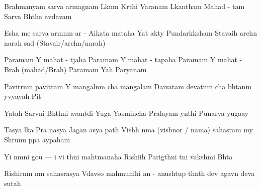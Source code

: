 \documentclass[20pt]{article}
\begin{document}
\SlokaHuge
{Brahmanyam sarva {\Dh}armagnam} {L{\oh}k{\A}n{\A}m K{\ee}rthi Var{\dhh}anam}
{L{\oh}kan{\A}tham Mahad - {\bh} {\oo}tam} {Sarva Bh{\oo}tha {\bh}av{\oh}d{\bh}avam}

\SlokaHuge
{Esha me sarva {\Dh}arm{\A}n{\A}m} {{\Dh}ar{\mo} - A{\dhh}ikata{\mo} mataha}
{Yat \dsh {\bh}akty{\A} Pundar{\ee}k{\A}ksham} {Stavaih arch{\e}n narah sad{\A} (Stavair/arch{\e}n/narah)}

\novspace
\SlokaHuge
{Paramam Y{\oh} mahat - t{\e}jaha} {Paramam Y{\oh} mahat - tapaha}
{Paramam Y{\oh} mahat - Brah{\ma} (mahad/Brah{\ma})} {Paramam Yah Par{\A}yanam}

\SlokaHuge
{Pavitr{\A}n{\A}m pavitram Y{\oh}} {mangal{\A}n{\A}m cha mangalam}
{Daivatam devat{\A}n{\A}m cha} {bh{\oo}tan{\A}m y{\oh}vyayah Pit{\A}}

\SlokaHuge
{Yatah Sarv{\A}ni Bh{\oo}th{\A}ni} {{\Bh}avant{\ya}di Yu{\ga}ga{\me}}
{Yasmin{\sh}cha Pralayam y{\A}nthi} {Punar{\e}va yuga{\ksh}ay{\e}}

\SlokaHuge
{Tasya l{\oh}ka Pra{\dhh} {\A}nasya} {Jagan{\na} {\Th}asya {\Bh} {\oo}path{\e}}
{Vish{\no}h \dsh n{\A}ma (vishnor / nama) sahasram m{\e}y} {Shrunu p{\A}pa {\Bh}ay{\A}paham}

\novspace
\SlokaHuge
{Y{\an}i n{\A}m{\A}ni gou {---} {\N}i} {vi{\kh} {\ya}th{\A}ni mah{\A}tmanaha}
{Rishi{\bh}ih Parig{\ee}th{\A}ni} {t{\ha}ni vaksh{\ya}mi Bh{\oo}ta{\ye}}

\SlokaHuge
{Rishirn{\A}m n{\A}m sahasrasya} {V{\e}dav{\ya}so mah{\A}munihi}
{{\ch}an{\dO} - anushtup thath{\A} dev{\oh}} {{\Bh}agav{\A}n deva{\ki} sutah}




\end{document}
